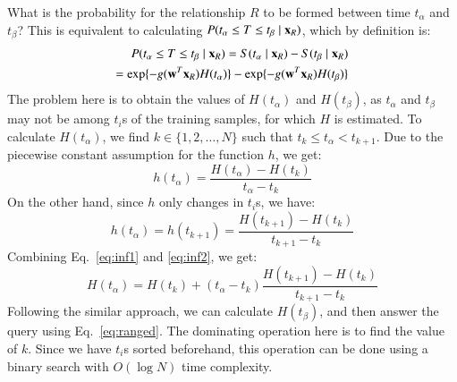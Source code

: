  What is the probability for the relationship $R$ to be formed between time $t_\alpha$ and $t_\beta$? This is equivalent to calculating $P(t_\alpha \le T \le t_\beta \mid \mathbf{x}_R)$, which by definition is:
\begin{equation}\label{eq:ranged}
\begin{split}
P(t_\alpha\le T \le t_\beta \mid \mb{x}_R) = S(t_\alpha\mid \mb{x}_R) - S(t_\beta\mid \mb{x}_R)\\
= \exp\{-g(\mb{w}^T\mb{x}_R){H}(t_\alpha)\} - \exp\{-g(\mb{w}^T\mb{x}_R){H}(t_\beta)\}
\end{split}
\end{equation}
The problem here is to obtain the values of ${H}(t_\alpha)$ and ${H}(t_\beta)$, as $t_\alpha$ and $t_\beta$ may not be among $t_i$s of the training samples, for which ${H}$ is estimated. To calculate ${H}(t_\alpha)$, we find $k\in\{1,2,\dots,N\}$ such that $t_k\le t_\alpha < t_{k+1}$.
Due to the piecewise constant assumption for the function $h$, we get:
\begin{equation}\label{eq:inf1}
{h}(t_\alpha)=\frac{{H}(t_\alpha)-{H}(t_k)}{t_\alpha-t_k}
\end{equation} 
On the other hand, since $h$ only changes in $t_i$s, we have:
\begin{equation}\label{eq:inf2}
{h}(t_\alpha)={h}(t_{k+1})=\frac{{H}(t_{k+1})-{H}(t_k)}{t_{k+1}-t_k}
\end{equation}
Combining Eq.~\ref{eq:inf1} and \ref{eq:inf2}, we get:
\begin{equation}\label{eq:inf3}
{H}(t_\alpha)={H}(t_k)+(t_\alpha-t_k)\frac{{H}(t_{k+1})-{H}(t_k)}{t_{k+1}-t_k}
\end{equation}
Following the similar approach, we can calculate ${H}(t_\beta)$, and then answer the query using Eq.~\ref{eq:ranged}. The dominating operation here is to find the value of $k$. Since we have $t_i$s sorted beforehand, this operation can be done using a binary search with $O(\log N)$ time complexity.\\

